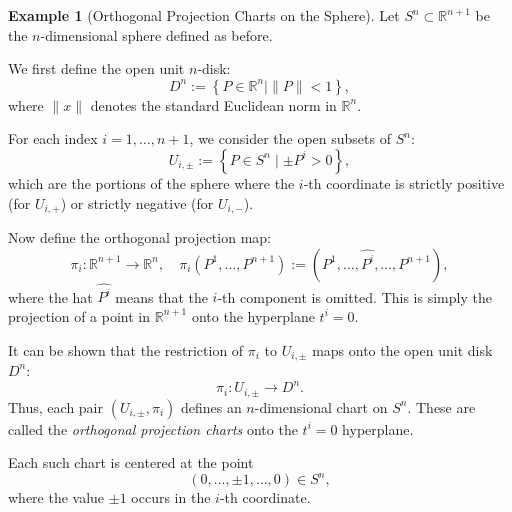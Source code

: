\documentclass[12pt]{article}
\theoremstyle{definition}
\newtheorem{example}{Example}[section]
\begin{document}
\medskip
\begin{example}[Orthogonal Projection Charts on the Sphere]
Let $S^n \subset \mathbb{R}^{n+1}$ be the $n$-dimensional sphere defined as before.

We first define the open unit $n$-disk:
\[
D^n := \left\{ P \in \mathbb{R}^n \mid \|P\| < 1 \right\},
\]
where $\|x\|$ denotes the standard Euclidean norm in $\mathbb{R}^n$.

For each index $i = 1, \ldots, n+1$, we consider the open subsets of $S^n$:
\[
U_{i,\pm} := \left\{ P \in S^n \mid \pm P^i > 0 \right\},
\]
which are the portions of the sphere where the $i$-th coordinate is strictly positive (for $U_{i,+}$) or strictly negative (for $U_{i,-}$).

Now define the orthogonal projection map:
\[
\pi_i : \mathbb{R}^{n+1} \to \mathbb{R}^n, \quad \pi_i(P^1, \ldots, P^{n+1}) := (P^1, \ldots, \widehat{P^i}, \ldots, P^{n+1}),
\]
where the hat $\widehat{P^i}$ means that the $i$-th component is omitted. This is simply the projection of a point in $\mathbb{R}^{n+1}$ onto the hyperplane $t^i = 0$.

It can be shown that the restriction of $\pi_i$ to $U_{i,\pm}$ maps onto the open unit disk $D^n$:
\[
\pi_i : U_{i,\pm} \to D^n.
\]
Thus, each pair $(U_{i,\pm}, \pi_i)$ defines an $n$-dimensional chart on $S^n$. These are called the \emph{orthogonal projection charts} onto the $t^i = 0$ hyperplane.

Each such chart is centered at the point
\[
(0, \ldots, \pm 1, \ldots, 0) \in S^n,
\]
where the value $\pm 1$ occurs in the $i$-th coordinate.
\end{example}
\end{document}
